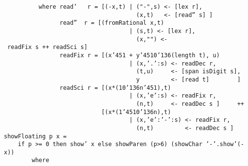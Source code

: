 \mbox{\tt \ \ \ \ \ \ \ \ \ \ where\ read'\ \ \ r\ =\ [(-x,t)\ |\ ("-",s)\ <-\ [lex\ r],}\\
\mbox{\tt \ \ \ \ \ \ \ \ \ \ \ \ \ \ \ \ \ \ \ \ \ \ \ \ \ \ \ \ \ \ \ \ \ \ \ \ \ \ (x,t)\ \ \ <-\ [read''\ s]\ ]}\\
\mbox{\tt \ \ \ \ \ \ \ \ \ \ \ \ \ \ \ \ read''\ \ r\ =\ [(fromRational\ x,t)}\\
\mbox{\tt \ \ \ \ \ \ \ \ \ \ \ \ \ \ \ \ \ \ \ \ \ \ \ \ \ \ \ \ \ \ \ \ \ \ \ \ |\ (s,t)\ <-\ [lex\ r],}\\
\mbox{\tt \ \ \ \ \ \ \ \ \ \ \ \ \ \ \ \ \ \ \ \ \ \ \ \ \ \ \ \ \ \ \ \ \ \ \ \ \ \ (x,"")\ <-\ readFix\ s\ ++\ readSci\ s]}\\
\mbox{\tt \ \ \ \ \ \ \ \ \ \ \ \ \ \ \ \ readFix\ r\ =\ [(x{\char'45}1\ +\ y{\char'45}10{\char'136}(length\ t),\ u)}\\
\mbox{\tt \ \ \ \ \ \ \ \ \ \ \ \ \ \ \ \ \ \ \ \ \ \ \ \ \ \ \ \ \ \ \ \ \ \ \ \ |\ (x,'.':s)\ <-\ readDec\ r,}\\
\mbox{\tt \ \ \ \ \ \ \ \ \ \ \ \ \ \ \ \ \ \ \ \ \ \ \ \ \ \ \ \ \ \ \ \ \ \ \ \ \ \ (t,u)\ \ \ \ \ <-\ [span\ isDigit\ s],}\\
\mbox{\tt \ \ \ \ \ \ \ \ \ \ \ \ \ \ \ \ \ \ \ \ \ \ \ \ \ \ \ \ \ \ \ \ \ \ \ \ \ \ y\ \ \ \ \ \ \ \ \ <-\ [read\ t]\ \ \ \ \ \ \ \ ]}\\
\mbox{\tt \ \ \ \ \ \ \ \ \ \ \ \ \ \ \ \ readSci\ r\ =\ [(x*(10{\char'136}n{\char'45}1),t)}\\
\mbox{\tt \ \ \ \ \ \ \ \ \ \ \ \ \ \ \ \ \ \ \ \ \ \ \ \ \ \ \ \ \ \ \ \ \ \ \ \ |\ (x,'e':s)\ <-\ readFix\ r,}\\
\mbox{\tt \ \ \ \ \ \ \ \ \ \ \ \ \ \ \ \ \ \ \ \ \ \ \ \ \ \ \ \ \ \ \ \ \ \ \ \ \ \ (n,t)\ \ \ \ \ <-\ readDec\ s\ ]\ \ \ \ \ ++}\\
\mbox{\tt \ \ \ \ \ \ \ \ \ \ \ \ \ \ \ \ \ \ \ \ \ \ \ \ \ \ \ \ [(x*(1{\char'45}10{\char'136}n),t)}\\
\mbox{\tt \ \ \ \ \ \ \ \ \ \ \ \ \ \ \ \ \ \ \ \ \ \ \ \ \ \ \ \ \ \ \ \ \ \ \ \ |\ (x,'e':'-':s)\ <-\ readFix\ r,}\\
\mbox{\tt \ \ \ \ \ \ \ \ \ \ \ \ \ \ \ \ \ \ \ \ \ \ \ \ \ \ \ \ \ \ \ \ \ \ \ \ \ \ (n,t)\ \ \ \ \ \ \ \ \ <-\ readDec\ s\ ]}
\eprogB\noindent\bprogB
\mbox{\tt showFloating\ p\ x\ =}\\
\mbox{\tt \ \ \ \ if\ p\ >=\ 0\ then\ show'\ x\ else\ showParen\ (p>6)\ (showChar\ '-'.show'(-x))}\\
\mbox{\tt \ \ \ \ \ \ \ \ where}\\
